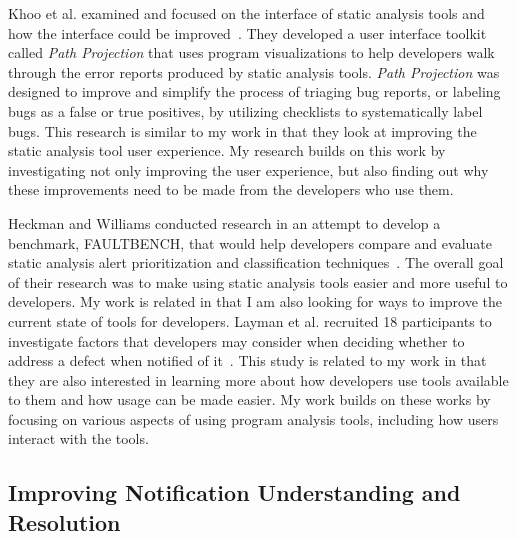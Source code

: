 \documentclass{llncs}
\begin{document}
Khoo et al. examined and focused on the interface of static analysis tools and
how the interface could be improved~\cite{Khoo:2008:PathProjection}. They
developed a user interface toolkit called \emph{Path Projection} that uses
program visualizations to help developers walk through the error reports
produced by static analysis tools.
\emph{Path Projection} was designed to improve and simplify the process of
triaging bug reports, or labeling bugs as a false or true positives, by
utilizing checklists to systematically label bugs. This research is similar to my
work in that they look at improving the static analysis tool user experience.
My research builds on this work by investigating not only improving the user
experience, but also finding out why these improvements need to be made from the
developers who use them.


Heckman and Williams conducted research in an attempt to develop a benchmark,
FAULTBENCH, that would help developers compare and evaluate static analysis
alert prioritization and classification techniques~\cite{Heckman:2008:Faultbench}. 
The overall goal of their research was to make using static analysis tools easier and more useful to developers.
My work is related in that I am also looking for ways to improve the current state of tools for developers. 
Layman et al. recruited 18 participants to investigate factors that developers may consider when deciding whether to
address a defect when notified of it~\cite{Layman:2007:FaultFix}. This study
is related to my work in that they are also interested in learning more about how developers use tools available to them 
and how usage can be made easier.  My work builds on these works by focusing on various
aspects of using program analysis tools, including how users interact with the
tools.

\subsection{Improving Notification Understanding and Resolution}
\end{document}
